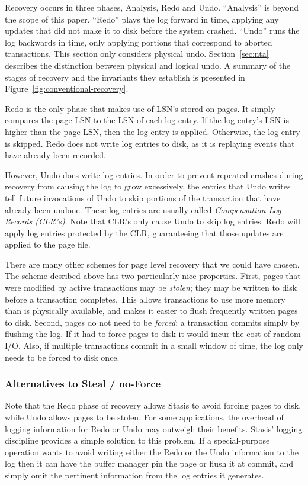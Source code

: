 \documentclass[letterpaper,twocolumn,10pt]{article}
\newcommand{\yad}{Stasis\xspace}
\newcommand{\yads}{Stasis'\xspace}
\begin{document}
Recovery occurs in three phases, Analysis, Redo and Undo.
``Analysis'' is beyond the scope of this paper.  ``Redo'' plays the
log forward in time, applying any updates that did not make it to disk
before the system crashed.  ``Undo'' runs the log backwards in time,
only applying portions that correspond to aborted transactions.  This
section only considers physical undo.  Section~\ref{sec:nta} describes
the distinction between physical and logical undo.
A summary of the stages of recovery and the invariants
they establish is presented in Figure~\ref{fig:conventional-recovery}.

Redo is the only phase that makes use of LSN's stored on pages.
It simply compares the page LSN to the LSN of each log entry.  If the
log entry's LSN is higher than the page LSN, then the log entry is
applied.  Otherwise, the log entry is skipped.  Redo does not write
log entries to disk, as it is replaying events that have already been
recorded.  

However, Undo does write log entries.  In order to prevent repeated
crashes during recovery from causing the log to grow excessively, the
entries that Undo writes tell future invocations of Undo to skip
portions of the transaction that have already been undone.  These log
entries are usually called {\em Compensation Log Records (CLR's)}.
Note that CLR's only cause Undo to skip log entries.  Redo will apply
log entries protected by the CLR, guaranteeing that those updates are
applied to the page file.

There are many other schemes for page level recovery that we could
have chosen.  The scheme desribed above has two particularly nice
properties.  First, pages that were modified by active transactions
may be {\em stolen}; they may be written to disk before a transaction
completes.  This allows transactions to use more memory than is
physically available, and makes it easier to flush frequently written
pages to disk.  Second, pages do not need to be {\em forced}; a
transaction commits simply by flushing the log.  If it had to force
pages to disk it would incur the cost of random I/O.  Also, if
multiple transactions commit in a small window of time, the log only
needs to be forced to disk once.

\subsubsection{Alternatives to Steal / no-Force}

Note that the Redo phase of recovery allows \yad to avoid forcing
pages to disk, while Undo allows pages to be stolen.  For some
applications, the overhead of logging information for Redo or Undo may
outweigh their benefits.  \yads logging discipline provides a simple
solution to this problem.  If a special-purpose operation wants to
avoid writing either the Redo or the Undo information to the log then
it can have the buffer manager pin the page or flush it at commit, and
simply omit the pertinent information from the log entries it
generates.
\end{document}
